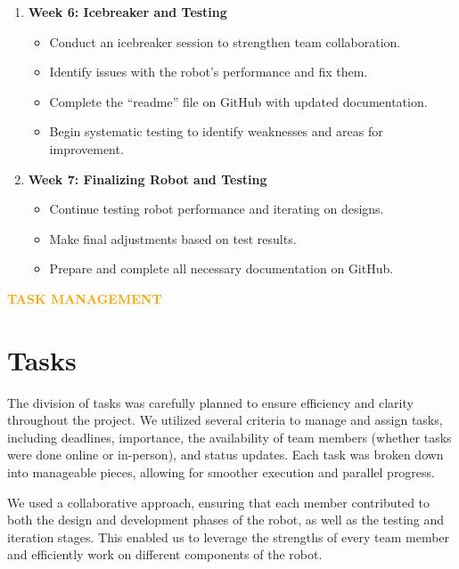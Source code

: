 \begin{enumerate}[1.]
    \item \textbf{Week 6: Icebreaker and Testing}
    \begin{itemize}
        \item Conduct an icebreaker session to strengthen team collaboration.
        \item Identify issues with the robot’s performance and fix them.
        \item Complete the “readme” file on GitHub with updated documentation.
        \item Begin systematic testing to identify weaknesses and areas for improvement.
    \end{itemize}
    
    \item \textbf{Week 7: Finalizing Robot and Testing}
    \begin{itemize}
        \item Continue testing robot performance and iterating on designs.
        \item Make final adjustments based on test results.
        \item Prepare and complete all necessary documentation on GitHub.
    \end{itemize}
\end{enumerate}

\newpage
\begin{center}
    \huge \textbf{\textcolor{orange}{TASK MANAGEMENT}} \\[0.5cm]
\end{center}
\section{Tasks}
 The division of tasks was carefully planned to ensure efficiency and clarity throughout the project. We utilized several criteria to manage and assign tasks, including deadlines, importance, the availability of team members (whether tasks were done online or in-person), and status updates. Each task was broken down into manageable pieces, allowing for smoother execution and parallel progress. 


We used a collaborative approach, ensuring that each member contributed to both the design and development phases of the robot, as well as the testing and iteration stages. This enabled us to leverage the strengths of every team member and efficiently work on different components of the robot. 

